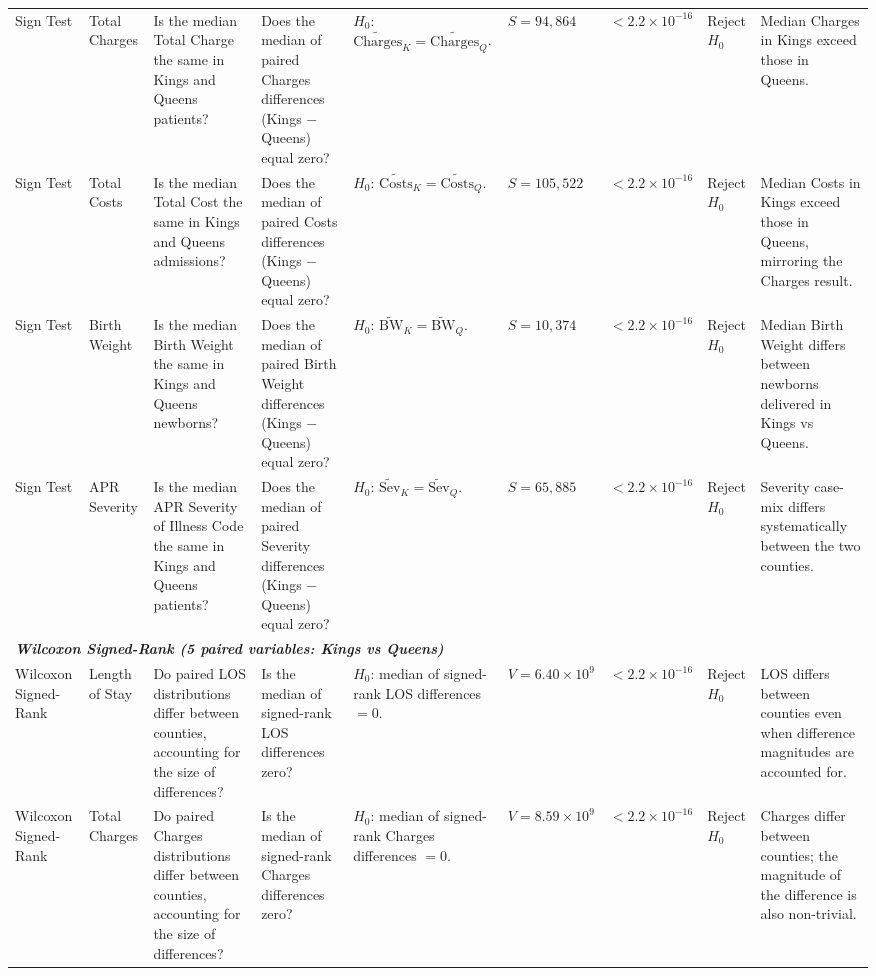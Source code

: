 \documentclass[12pt]{article}
\begin{document}
\begin{landscape}
\begin{scriptsize}
\begin{longtable}{p{2.0cm} p{2.4cm} p{3.0cm} p{2.7cm} p{2.5cm} p{1.7cm} p{1.3cm} p{1.3cm} p{3.0cm}}
Sign Test & Total Charges & Is the median Total Charge the same in Kings and Queens patients? & Does the median of paired Charges differences (Kings $-$ Queens) equal zero? & $H_0$: $\widetilde{\mathrm{Charges}}_K = \widetilde{\mathrm{Charges}}_Q$. & $S = 94{,}864$ & $< 2.2 \times 10^{-16}$ & Reject $H_0$ & Median Charges in Kings exceed those in Queens. \\

Sign Test & Total Costs & Is the median Total Cost the same in Kings and Queens admissions? & Does the median of paired Costs differences (Kings $-$ Queens) equal zero? & $H_0$: $\widetilde{\mathrm{Costs}}_K = \widetilde{\mathrm{Costs}}_Q$. & $S = 105{,}522$ & $< 2.2 \times 10^{-16}$ & Reject $H_0$ & Median Costs in Kings exceed those in Queens, mirroring the Charges result. \\

Sign Test & Birth Weight & Is the median Birth Weight the same in Kings and Queens newborns? & Does the median of paired Birth Weight differences (Kings $-$ Queens) equal zero? & $H_0$: $\widetilde{\mathrm{BW}}_K = \widetilde{\mathrm{BW}}_Q$. & $S = 10{,}374$ & $< 2.2 \times 10^{-16}$ & Reject $H_0$ & Median Birth Weight differs between newborns delivered in Kings vs Queens. \\

Sign Test & APR Severity & Is the median APR Severity of Illness Code the same in Kings and Queens patients? & Does the median of paired Severity differences (Kings $-$ Queens) equal zero? & $H_0$: $\widetilde{\mathrm{Sev}}_K = \widetilde{\mathrm{Sev}}_Q$. & $S = 65{,}885$ & $< 2.2 \times 10^{-16}$ & Reject $H_0$ & Severity case-mix differs systematically between the two counties. \\

\midrule
\multicolumn{9}{l}{\textit{\textbf{Wilcoxon Signed-Rank (5 paired variables: Kings vs Queens)}}} \\

Wilcoxon Signed-Rank & Length of Stay & Do paired LOS distributions differ between counties, accounting for the size of differences? & Is the median of signed-rank LOS differences zero? & $H_0$: median of signed-rank LOS differences $= 0$. & $V = 6.40 \times 10^{9}$ & $< 2.2 \times 10^{-16}$ & Reject $H_0$ & LOS differs between counties even when difference magnitudes are accounted for. \\

Wilcoxon Signed-Rank & Total Charges & Do paired Charges distributions differ between counties, accounting for the size of differences? & Is the median of signed-rank Charges differences zero? & $H_0$: median of signed-rank Charges differences $= 0$. & $V = 8.59 \times 10^{9}$ & $< 2.2 \times 10^{-16}$ & Reject $H_0$ & Charges differ between counties; the magnitude of the difference is also non-trivial. \\


\end{longtable}
\end{scriptsize}
\end{landscape}
\end{document}
